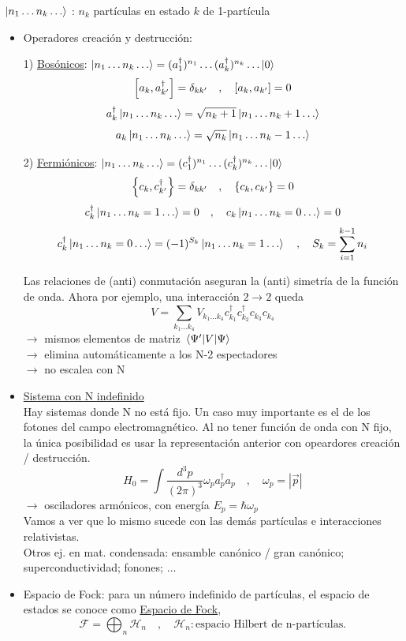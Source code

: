 \noindent $\ket{n_1 \dots n_k \dots}$ : $n_k$ partículas en estado $k$ de 1-partícula
\begin{itemize}
    \item Operadores creación y destrucción:

          1) \underline{Bosónicos}: $\ket{n_1 \dots n_k \dots} = (a_1^\dagger)^{n_1} \dots (a_k^\dagger)^{n_k} \dots \ket{0}$
          $$ \comm{a_k}{a_{k'}^\dagger} = \delta_{kk'} \quad , \quad \comm{a_k}{a_{k'}} = 0 $$
          $$ a_k^\dagger \ket{n_1 \dots n_k \dots} = \sqrt{n_k+1} \ket{n_1 \dots n_k+1 \dots} $$
          $$ a_k \ket{n_1 \dots n_k \dots} = \sqrt{n_k} \ket{n_1 \dots n_k-1 \dots} $$

          2) \underline{Fermiónicos}: $\ket{n_1 \dots n_k \dots} = (c_1^\dagger)^{n_1} \dots (c_k^\dagger)^{n_k} \dots \ket{0}$
          $$ \acomm{c_k}{c_{k'}^\dagger} = \delta_{kk'} \quad , \quad \acomm{c_k}{c_{k'}} = 0 $$
          $$ c_k^\dagger \ket{n_1 \dots n_k=1 \dots} = 0 \quad , \quad c_k \ket{n_1 \dots n_k=0 \dots} = 0 $$
          $$ c_k^\dagger \ket{n_1 \dots n_k=0 \dots} = (-1)^{S_k} \ket{n_1 \dots n_k=1 \dots} \quad , \quad S_k = \sum_{i=1}^{k-1} n_i $$

          Las relaciones de (anti) conmutación aseguran la (anti) simetría de la función de onda. Ahora por ejemplo, una interacción $2 \rightarrow 2$ queda
          $$ V = \sum_{k_1 \dots k_4} V_{k_1 \dots k_4} c_{k_1}^\dagger c_{k_2}^\dagger c_{k_3} c_{k_4} $$
          $\rightarrow$ mismos elementos de matriz $\matrixel{\Psi'}{V}{\Psi}$ \\
          $\rightarrow$ elimina automáticamente a los N-2 espectadores \\
          $\rightarrow$ no escalea con N
\end{itemize}

\begin{itemize}
    \item \underline{Sistema con N indefinido} \\
          Hay sistemas donde N no está fijo. Un caso muy importante es el de los fotones del campo electromagnético.
          Al no tener función de onda con N fijo, la única posibilidad es usar la representación anterior con opeardores creación / destrucción.
          $$ H_0 = \int \frac{d^3p}{(2\pi)^3} \omega_p a_p^\dagger a_p \quad , \quad \omega_p = |\vec{p}| $$
          $\rightarrow$ osciladores armónicos, con energía $E_p = \hbar \omega_p$ \\
          Vamos a ver que lo mismo sucede con las demás partículas e interacciones relativistas. \\
          Otros ej. en mat. condensada: ensamble canónico / gran canónico; superconductividad; fonones; $\dots$
    \item Espacio de Fock: para un número indefinido de partículas, el espacio de estados se conoce como \underline{Espacio de Fock},
          $$ \mathcal{F} = \bigoplus_n \mathcal{H}_n \quad , \quad \mathcal{H}_n : \text{espacio Hilbert de n-partículas.} $$
\end{itemize}

